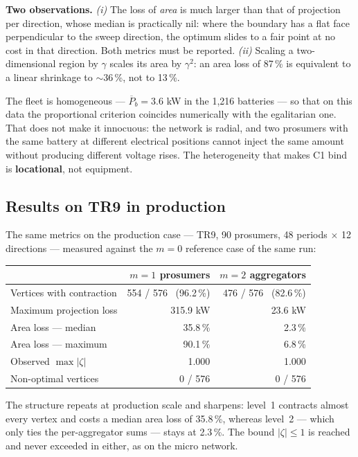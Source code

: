 \documentclass[11pt,a4paper]{article}
\begin{document}
\begin{keybox}
\textbf{Two observations.} \emph{(i)} The loss of \emph{area} is much larger than that of projection
per direction, whose median is practically nil: where the boundary has a flat face
perpendicular to the sweep direction, the optimum slides to a fair point at no cost in that
direction. Both metrics must be reported. \emph{(ii)} Scaling a two-dimensional region by $\gamma$
scales its area by $\gamma^2$: an area loss of 87\,\% is equivalent to a linear shrinkage to
$\sim$36\,\%, not to 13\,\%.
\end{keybox}

The fleet is homogeneous --- $\overline{P}_b = 3.6$ kW in the 1,216 batteries --- so that on this
data the proportional criterion coincides numerically with the egalitarian one. That does not make
it innocuous: the network is radial, and two prosumers with the same battery at different electrical
positions cannot inject the same amount without producing different voltage rises. The
heterogeneity that makes C1 bind is \textbf{locational}, not equipment.


\subsection{Results on TR9 in production}

The same metrics on the production case --- TR9, 90 prosumers, 48 periods $\times$ 12 directions ---
measured against the $m=0$ reference case of the same run:

\begin{center}\small
\begin{tabular}{l r r}
\toprule
& $m=1$ \textbf{prosumers} & $m=2$ \textbf{aggregators}\\
\midrule
Vertices with contraction & 554 / 576 \ (96.2\,\%) & 476 / 576 \ (82.6\,\%)\\
Maximum projection loss & 315.9 kW & 23.6 kW\\
Area loss --- median & 35.8\,\% & 2.3\,\%\\
Area loss --- maximum & 90.1\,\% & 6.8\,\%\\
Observed $\max|\zeta|$ & 1.000 & 1.000\\
Non-optimal vertices & 0 / 576 & 0 / 576\\
\bottomrule
\end{tabular}
\end{center}

The structure repeats at production scale and sharpens: level~1 contracts almost every vertex and
costs a median area loss of 35.8\,\%, whereas level~2 --- which only ties the per-aggregator sums ---
stays at 2.3\,\%. The bound $|\zeta|\le1$ is reached and never exceeded in either, as on the micro
network.
\end{document}
